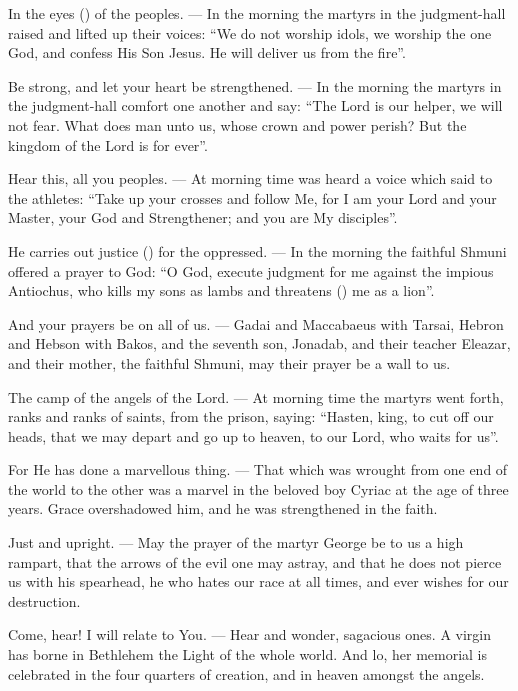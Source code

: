 \documentclass[12pt,twoside,a5paper]{article}
\begin{document}
\begin{halfparskip}
  In the eyes () of the peoples. --- In the morning the martyrs in the judgment-hall raised and lifted up their voices: ``We do not worship idols, we worship the one God, and confess His Son Jesus. He will deliver us from the fire''.

  Be strong, and let your heart be strengthened. --- In the morning the martyrs in the judgment-hall comfort one another and say: ``The Lord is our helper, we will not fear. What does man unto us, whose crown and power perish? But the kingdom of the Lord is for ever''.

  Hear this, all you peoples. --- At morning time was heard a voice which said to the athletes: ``Take up your crosses and follow Me, for I am your Lord and your Master, your God and Strengthener; and you are My disciples''.

  He carries out justice () for the oppressed. --- In the morning the faithful Shmuni offered a prayer to God: ``O God, execute judgment for me against the impious Antiochus, who kills my sons as lambs and threatens () me as a lion''.

  And your prayers be on all of us. --- Gadai and Maccabaeus with Tarsai, Hebron and Hebson with Bakos, and the seventh son, Jonadab, and their teacher Eleazar, and their mother, the faithful Shmuni, may their prayer be a wall to us.

  The camp of the angels of the Lord. --- At morning time the martyrs went forth, ranks and ranks of saints, from the prison, saying: ``Hasten, king, to cut off our heads, that we may depart and go up to heaven, to our Lord, who waits for us''.

  For He has done a marvellous thing. --- That which was wrought from one end of the world to the other was a marvel in the beloved boy Cyriac at the age of three years. Grace overshadowed him, and he was strengthened in the faith.

  Just and upright. --- May the prayer of the martyr George be to us a high rampart, that the arrows of the evil one may astray, and that he does not pierce us with his spearhead, he who hates our race at all times, and ever wishes for our destruction.

  Come, hear! I will relate to You. --- Hear and wonder, sagacious ones. A virgin has borne in Bethlehem the Light of the whole world. And lo, her memorial is celebrated in the four quarters of creation, and in heaven amongst the angels.


\end{halfparskip}
\end{document}
